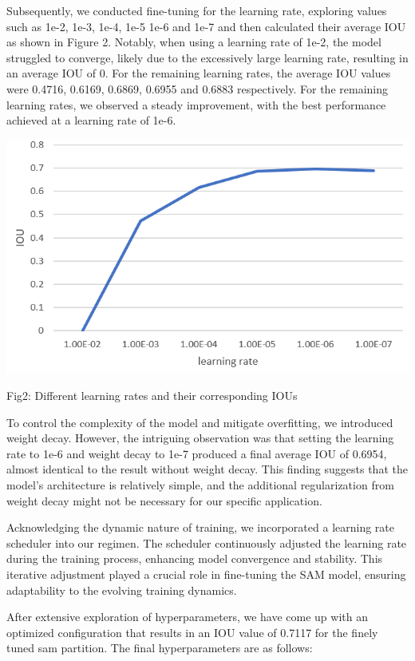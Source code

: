 \documentclass[12pt, a4paper, oneside]{article}
\begin{document}
Subsequently, we conducted fine-tuning for the learning rate, exploring values such as 1e-2, 1e-3, 1e-4, 1e-5 1e-6 and 1e-7 and then calculated their average IOU as shown in Figure 2. Notably, when using a learning rate of 1e-2, the model struggled to converge, likely due to the excessively large learning rate, resulting in an average IOU of 0. For the remaining learning rates, the average IOU values were 0.4716, 0.6169, 0.6869, 0.6955 and 0.6883 respectively. For the remaining learning rates, we observed a steady improvement, with the best performance achieved at a learning rate of 1e-6.

\begin{center}
\includegraphics[width=1\textwidth]{4.png}
\caption{Fig2: Different learning rates and their corresponding IOUs}
\end{center}

To control the complexity of the model and mitigate overfitting, we introduced weight decay. However, the intriguing observation was that setting the learning rate to 1e-6 and weight decay to 1e-7 produced a final average IOU of 0.6954, almost identical to the result without weight decay. This finding suggests that the model's architecture is relatively simple, and the additional regularization from weight decay might not be necessary for our specific application.

Acknowledging the dynamic nature of training, we incorporated a learning rate scheduler into our regimen. The scheduler continuously adjusted the learning rate during the training process, enhancing model convergence and stability. This iterative adjustment played a crucial role in fine-tuning the SAM model, ensuring adaptability to the evolving training dynamics.

After extensive exploration of hyperparameters, we have come up with an optimized configuration that results in an IOU value of 0.7117 for the finely tuned sam partition. The final hyperparameters are as follows:
\end{document}
